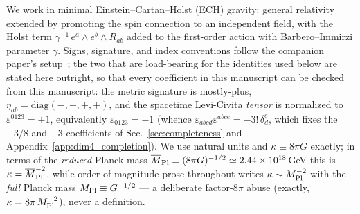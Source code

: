 \documentclass[aps,prd,twocolumn,superscriptaddress,showpacs,preprintnumbers,nofootinbib,longbibliography,floatfix]{revtex4-2}
\newcommand{\MPl}{M_{\rm Pl}}
\begin{document}
We work in minimal Einstein--Cartan--Holst (ECH) gravity: general
relativity extended by promoting the spin connection to an independent
field, with the Holst term $\gamma^{-1}\,e^a\!\wedge e^b\wedge R_{ab}$
added to the first-order action with Barbero--Immirzi parameter $\gamma$.
Signs, signature, and index conventions follow the companion paper's
setup~\cite{Golden2026P1a}; the two that are load-bearing for the
identities used below are stated here outright, so that every
coefficient in this manuscript can be checked from this manuscript: the
metric signature is mostly-plus, $\eta_{ab}=\mathrm{diag}(-,+,+,+)$, and
the spacetime Levi-Civita \emph{tensor} is normalized to
$\varepsilon^{0123}=+1$, equivalently $\varepsilon_{0123}=-1$ (whence
$\varepsilon_{abcd}\varepsilon^{abce}=-3!\,\delta^e_d$, which fixes the
$-3/8$ and $-3$ coefficients of
Sec.~\ref{sec:completeness} and Appendix~\ref{app:dim4_completion}).
We use natural units and
$\kappa\equiv8\pi G$ exactly; in terms of the \emph{reduced} Planck mass
$\overline{M}_{\rm Pl}\equiv(8\pi G)^{-1/2}\simeq2.44\times10^{18}\,$GeV
this is $\kappa=\overline{M}_{\rm Pl}^{-2}$, while order-of-magnitude
prose throughout writes $\kappa\sim\MPl^{-2}$ with the \emph{full}
Planck mass $\MPl\equiv G^{-1/2}$ --- a deliberate factor-$8\pi$ abuse
(exactly, $\kappa=8\pi\,\MPl^{-2}$), never a definition.
\end{document}
